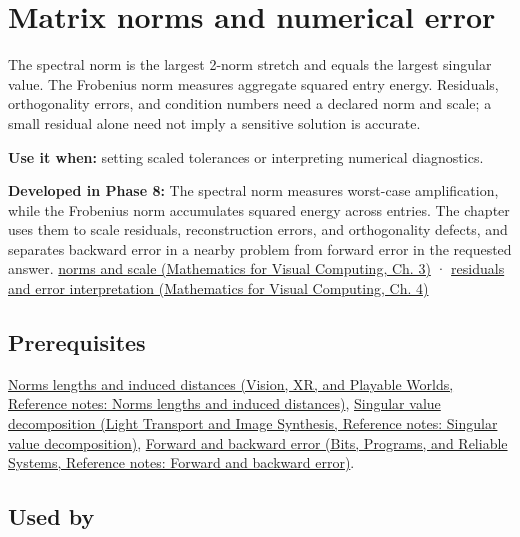 \hypertarget{appendix-f8657bac66e5}{}\label{referencestart:appendix-f8657bac66e5}
\section{Matrix norms and numerical error}\label{appendix-f8657bac66e5-matrix-norms-and-numerical-error}

The spectral norm is the largest 2-norm stretch and equals the largest singular value. The Frobenius norm measures aggregate squared entry energy. Residuals, orthogonality errors, and condition numbers need a declared norm and scale; a small residual alone need not imply a sensitive solution is accurate.

\textbf{Use it when:} setting scaled tolerances or interpreting numerical diagnostics.

\textbf{Developed in Phase 8:} The spectral norm measures worst-case amplification, while the Frobenius norm accumulates squared energy across entries. The chapter uses them to scale residuals, reconstruction errors, and orthogonality defects, and separates backward error in a nearby problem from forward error in the requested answer. \href{../02-Mathematics-for-Visual-Computing/main.pdf\#nameddest=01-foundations-i-ch019-matrix-norms-put-scale-into-error-statements}{norms and scale (Mathematics for Visual Computing, Ch. 3)} · \href{../02-Mathematics-for-Visual-Computing/main.pdf\#nameddest=01-foundations-i-ch020-residuals-distinguish-backward-accuracy-from-forward-certainty}{residuals and error interpretation (Mathematics for Visual Computing, Ch. 4)}

\subsection{Prerequisites}\label{appendix-f8657bac66e5-prerequisites}

\href{../07-Vision-XR-and-Playable-Worlds/main.pdf\#nameddest=appendix-49933872bb51}{Norms lengths and induced distances (Vision, XR, and Playable Worlds, Reference notes: Norms lengths and induced distances)}, \href{../04-Light-Transport-and-Image-Synthesis/main.pdf\#nameddest=appendix-1fad5e7f36fa}{Singular value decomposition (Light Transport and Image Synthesis, Reference notes: Singular value decomposition)}, \href{../01-Bits-Programs-and-Reliable-Systems/main.pdf\#nameddest=appendix-a7fbaf6d1b1c}{Forward and backward error (Bits, Programs, and Reliable Systems, Reference notes: Forward and backward error)}.

\subsection{Used by}\label{appendix-f8657bac66e5-used-by}

